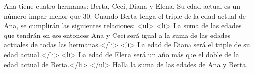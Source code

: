 Ana tiene cuatro hermanas: Berta, Ceci, Diana y Elena. Su edad actual es un número impar menor que $30$. Cuando Berta tenga el triple de la edad actual de Ana, se cumplirán las siguientes relaciones:
<ul>
<li> La suma de las edades que tendrán en ese entonces Ana y Ceci será igual a la suma de las edades actuales de todas las hermanas.</li>
<li> La edad de Diana será el triple de su edad actual.</li>
<li> La edad de Elena será un año más que el doble de la edad actual de Berta.</li>
</ul>
Halla la suma de las edades de Ana y Berta.